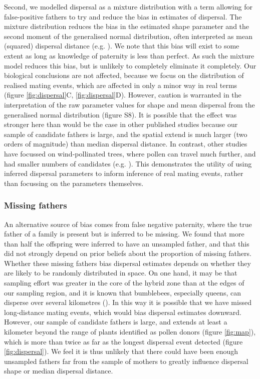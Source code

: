 \documentclass[10pt, a4paper, twocolumn]{article} %
\begin{document}
Second, we modelled dispersal as a mixture distribution with a term allowing for false-positive fathers to try and reduce the bias in estimates of dispersal.
The mixture distribution reduces the bias in the estimated shape parameter and the second moment of the generalised normal distribution, often interpreted as mean (squared) dispersal distance (e.g. \cite{clark1998trees, austerlitz2004using, klein2008pollen}).
We note that this bias will exist to some extent as long as knowledge of paternity is less than perfect.
As such the mixture model reduces this bias, but is unlikely to completely eliminate it completely.
Our biological conclusions are not affected, because we focus on the distribution of realised mating events, which are affected in only a minor way in real terms (figure \ref{fig:dispersal}C, \ref{fig:dispersal}D).
However, caution is warranted in the interpretation of the raw parameter values for shape and mean dispersal from the generalised normal distribution (figure S8).
It is possible that the effect was stronger here than would be the case in other published studies because our sample of candidate fathers is large, and the spatial extend is much larger (two orders of magnitude) than median dispersal distance.
In contrast, other studies have focussed on wind-pollinated trees, where pollen can travel much further, and had smaller numbers of candidates (e.g. \cite{adams1992using, austerlitz2004using, klein2008pollen}).
This demonstrates the utility of using inferred dispersal parameters to inform inference of real mating events, rather than focussing on the parameters themselves.

\subsubsection{Missing fathers}

An alternative source of bias comes from false negative paternity, where the true father of a family is present but is inferred to be missing.
We found that more than half the offspring were inferred to have an unsampled father, and that this did not strongly depend on prior beliefs about the proportion of missing fathers.
Whether these missing fathers bias dispersal estimates depends on whether they are likely to be randomly distributed in space.
On one hand, it may be that sampling effort was greater in the core of the hybrid zone than at the edges of our sampling region, and it is known that bumblebees, especially queens, can disperse over several kilometres (\cite{osborne2008bumblebee, hagen2011space, lepais2010estimation}).
In this way it is possible that we have missed long-distance mating events, which would bias dispersal estimates downward.
However, our sample of candidate fathers is large, and extends at least a kilometer beyond the range of plants identified as pollen donors (figure \ref{fig:map}), which is more than twice as far as the longest dispersal event detected (figure \ref{fig:dispersal}).
We feel it is thus unlikely that there could have been enough unsampled fathers far from the sample of mothers to greatly influence dispersal shape or median dispersal distance.
\end{document}
